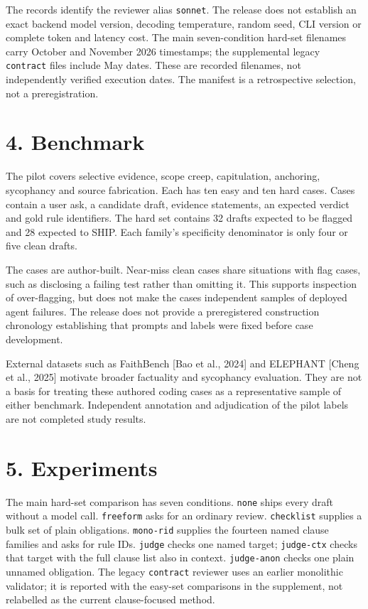 \documentclass[
  10pt,
  a4paper,
]{article}
\begin{document}
The records identify the reviewer alias \texttt{sonnet}. The release
does not establish an exact backend model version, decoding temperature,
random seed, CLI version or complete token and latency cost. The main
seven-condition hard-set filenames carry October and November 2026
timestamps; the supplemental legacy \texttt{contract} files include May
dates. These are recorded filenames, not independently verified
execution dates. The manifest is a retrospective selection, not a
preregistration.

\section{4. Benchmark}\label{benchmark}

The pilot covers selective evidence, scope creep, capitulation,
anchoring, sycophancy and source fabrication. Each has ten easy and ten
hard cases. Cases contain a user ask, a candidate draft, evidence
statements, an expected verdict and gold rule identifiers. The hard set
contains 32 drafts expected to be flagged and 28 expected to SHIP. Each
family's specificity denominator is only four or five clean drafts.

The cases are author-built. Near-miss clean cases share situations with
flag cases, such as disclosing a failing test rather than omitting it.
This supports inspection of over-flagging, but does not make the cases
independent samples of deployed agent failures. The release does not
provide a preregistered construction chronology establishing that
prompts and labels were fixed before case development.

External datasets such as FaithBench {[}Bao et al., 2024{]} and ELEPHANT
{[}Cheng et al., 2025{]} motivate broader factuality and sycophancy
evaluation. They are not a basis for treating these authored coding
cases as a representative sample of either benchmark. Independent
annotation and adjudication of the pilot labels are not completed study
results.

\section{5. Experiments}\label{experiments}

The main hard-set comparison has seven conditions. \texttt{none} ships
every draft without a model call. \texttt{freeform} asks for an ordinary
review. \texttt{checklist} supplies a bulk set of plain obligations.
\texttt{mono-rid} supplies the fourteen named clause families and asks
for rule IDs. \texttt{judge} checks one named target; \texttt{judge-ctx}
checks that target with the full clause list also in context.
\texttt{judge-anon} checks one plain unnamed obligation. The legacy
\texttt{contract} reviewer uses an earlier monolithic validator; it is
reported with the easy-set comparisons in the supplement, not relabelled
as the current clause-focused method.
\end{document}
